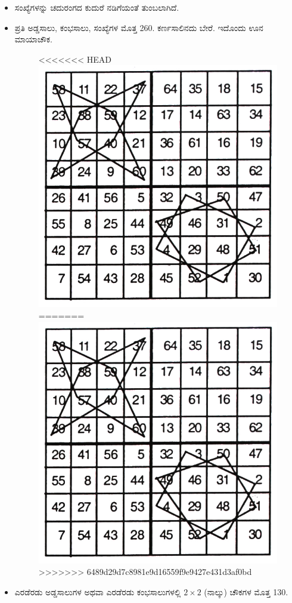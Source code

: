 \begin{itemize}
	\item ಸಂಖ್ಯೆಗಳನ್ನು ಚದುರಂಗದ ಕುದುರೆ ನಡಿಗೆಯಂತೆ ತುಂಬಲಾಗಿದೆ.
	\item ಪ್ರತಿ ಅಡ್ಡಸಾಲು, ಕಂಭಸಾಲು, ಸಂಖ್ಯೆಗಳ ಮೊತ್ತ 260. ಕರ್ಣಸಾಲಿನದು ಬೇರೆ. ಇದೊಂದು ಊನ ಮಾಯಾಚೌಕ.
	\begin{figure}[H]
<<<<<<< HEAD
	\includegraphics{src/figures/chap6/fig6-4.jpg}
=======
	\includegraphics[scale=.8]{src/figures/chap6/fig6.4.jpg}
>>>>>>> 6489d29d7c8981e9d16559f9e9427e431d3af0bd
	\end{figure}
	\item ಎರಡೆರಡು ಅಡ್ಡಸಾಲುಗಳ ಅಥವಾ ಎರಡೆರಡು ಕಂಭಸಾಲುಗಳಲ್ಲಿ $2 \times 2$ (ನಾಲ್ಕು) ಚೌಕಗಳ ಮೊತ್ತ 130.


\end{itemize}
